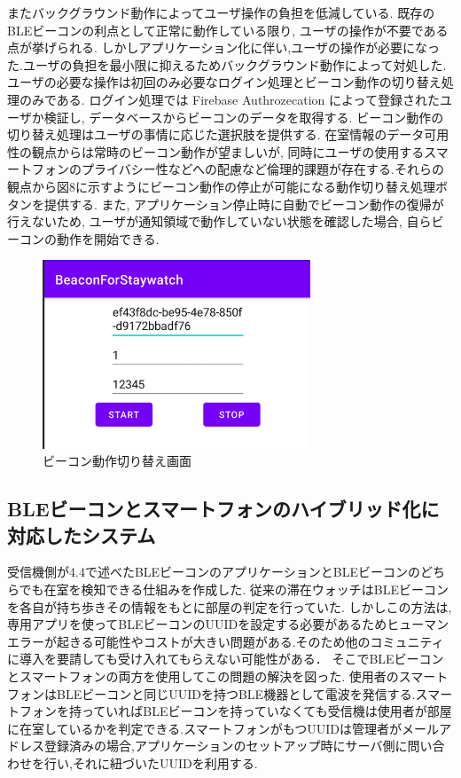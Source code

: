 \documentclass[a4j,8pt,twocolumn]{extarticle}
\begin{document}
またバックグラウンド動作によってユーザ操作の負担を低減している. 既存のBLEビーコンの利点として正常に動作している限り, 
ユーザの操作が不要である点が挙げられる. しかしアプリケーション化に伴い,ユーザの操作が必要になった.ユーザの負担を最小限に抑えるためバックグラウンド動作によって対処した. 
ユーザの必要な操作は初回のみ必要なログイン処理とビーコン動作の切り替え処理のみである.
ログイン処理では Firebase Authrozecation によって登録されたユーザか検証し, データベースからビーコンのデータを取得する.
ビーコン動作の切り替え処理はユーザの事情に応じた選択肢を提供する. 在室情報のデータ可用性の観点からは常時のビーコン動作が望ましいが, 同時にユーザの使用するスマートフォンのプライバシー性などへの配慮など倫理的課題が存在する.それらの観点から図8に示すようにビーコン動作の停止が可能になる動作切り替え処理ボタンを提供する. また, アプリケーション停止時に自動でビーコン動作の復帰が行えないため, ユーザが通知領域で動作していない状態を確認した場合, 自らビーコンの動作を開始できる.


\begin{figure}[tbh]
    \centering
    \includegraphics[width=8cm]{using.jpg}
    \caption{ビーコン動作切り替え画面}
    \label{multipleBPM}
\end{figure}


\subsection{BLEビーコンとスマートフォンのハイブリッド化に対応したシステム}
受信機側が4.4で述べたBLEビーコンのアプリケーションとBLEビーコンのどちらでも在室を検知できる仕組みを作成した.
従来の滞在ウォッチはBLEビーコンを各自が持ち歩きその情報をもとに部屋の判定を行っていた.
しかしこの方法は,専用アプリを使ってBLEビーコンのUUIDを設定する必要があるためヒューマンエラーが起きる可能性やコストが大きい問題がある.そのため他のコミュニティに導入を要請しても受け入れてもらえない可能性がある．
そこでBLEビーコンとスマートフォンの両方を使用してこの問題の解決を図った.
使用者のスマートフォンはBLEビーコンと同じUUIDを持つBLE機器として電波を発信する.スマートフォンを持っていればBLEビーコンを持っていなくても受信機は使用者が部屋に在室しているかを判定できる.スマートフォンがもつUUIDは管理者がメールアドレス登録済みの場合,アプリケーションのセットアップ時にサーバ側に問い合わせを行い,それに紐づいたUUIDを利用する.
\end{document}
